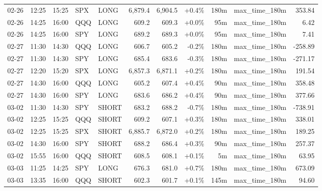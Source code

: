 \documentclass[11pt,a4paper,twoside]{article}
\begin{document}
\begin{center}
\begin{longtable}{>{\color{txtmain}}l l l l l r r r r >{\color{txtmain}}l r}
02-26 & 12:25 & 15:25 & SPX & LONG & 6,879.4 & 6,904.5 & \textcolor{wingreen}{+0.4\%} & 180m & max\_time\_180m & \textcolor{wingreen}{353.84} \\
02-26 & 14:25 & 16:00 & QQQ & LONG & 609.2 & 609.3 & \textcolor{wingreen}{+0.0\%} & 95m & max\_time\_180m & \textcolor{wingreen}{6.42} \\
02-26 & 14:25 & 16:00 & SPY & LONG & 689.2 & 689.3 & \textcolor{wingreen}{+0.0\%} & 95m & max\_time\_180m & \textcolor{wingreen}{7.41} \\
02-27 & 11:30 & 14:30 & QQQ & LONG & 606.7 & 605.2 & \textcolor{lossred}{-0.2\%} & 180m & max\_time\_180m & \textcolor{lossred}{-258.89} \\
02-27 & 11:30 & 14:30 & SPY & LONG & 685.4 & 683.6 & \textcolor{lossred}{-0.3\%} & 180m & max\_time\_180m & \textcolor{lossred}{-271.17} \\
02-27 & 12:20 & 15:20 & SPX & LONG & 6,857.3 & 6,871.1 & \textcolor{wingreen}{+0.2\%} & 180m & max\_time\_180m & \textcolor{wingreen}{191.54} \\
02-27 & 14:30 & 16:00 & QQQ & LONG & 605.2 & 607.4 & \textcolor{wingreen}{+0.4\%} & 90m & max\_time\_180m & \textcolor{wingreen}{358.48} \\
02-27 & 14:30 & 16:00 & SPY & LONG & 683.6 & 686.2 & \textcolor{wingreen}{+0.4\%} & 90m & max\_time\_180m & \textcolor{wingreen}{377.66} \\
03-02 & 11:30 & 14:30 & SPY & SHORT & 683.2 & 688.2 & \textcolor{lossred}{-0.7\%} & 180m & max\_time\_180m & \textcolor{lossred}{-738.91} \\
03-02 & 12:25 & 15:25 & QQQ & SHORT & 609.2 & 607.1 & \textcolor{wingreen}{+0.3\%} & 180m & max\_time\_180m & \textcolor{wingreen}{338.01} \\
03-02 & 12:25 & 15:25 & SPX & SHORT & 6,885.7 & 6,872.0 & \textcolor{wingreen}{+0.2\%} & 180m & max\_time\_180m & \textcolor{wingreen}{189.25} \\
03-02 & 14:30 & 16:00 & SPY & SHORT & 688.2 & 686.4 & \textcolor{wingreen}{+0.3\%} & 90m & max\_time\_180m & \textcolor{wingreen}{257.37} \\
03-02 & 15:55 & 16:00 & QQQ & SHORT & 608.5 & 608.1 & \textcolor{wingreen}{+0.1\%} & 5m & max\_time\_180m & \textcolor{wingreen}{63.95} \\
03-03 & 11:25 & 14:25 & SPY & LONG & 676.3 & 681.0 & \textcolor{wingreen}{+0.7\%} & 180m & max\_time\_180m & \textcolor{wingreen}{673.09} \\
03-03 & 13:35 & 16:00 & QQQ & SHORT & 602.3 & 601.7 & \textcolor{wingreen}{+0.1\%} & 145m & max\_time\_180m & \textcolor{wingreen}{94.60} \\

\end{longtable}
\end{center}
\end{document}
